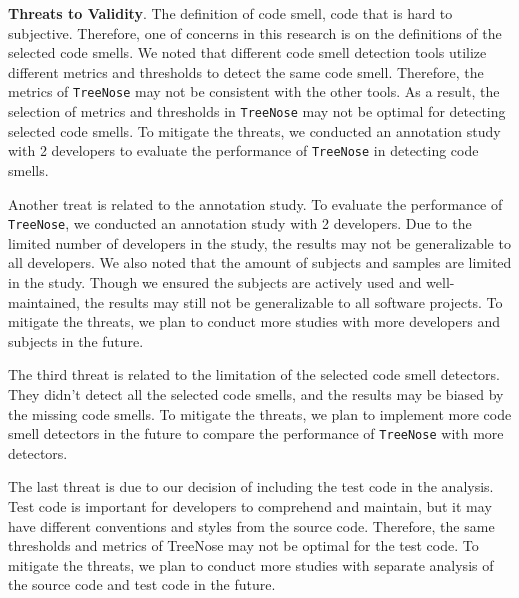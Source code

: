 {\bf Threats to Validity}. The definition of code smell, code that is hard to
subjective. Therefore, one of concerns in this research is on the definitions
of the selected code smells. We noted that different code smell detection tools
utilize different metrics and thresholds to detect the same code smell.
Therefore, the metrics of \texttt{TreeNose} may not be consistent with the
other tools. As a result, the selection of metrics and thresholds in
\texttt{TreeNose} may not be optimal for detecting selected code smells. To
mitigate the threats, we conducted an annotation study with 2 developers to
evaluate the performance of \texttt{TreeNose} in detecting code smells.

Another treat is related to the annotation study. To evaluate the performance
of \texttt{TreeNose}, we conducted an annotation study with 2 developers. Due
to the limited number of developers in the study, the results may not be
generalizable to all developers. We also noted that the amount of subjects and
samples are limited in the study. Though we ensured the subjects are actively
used and well-maintained, the results may still not be generalizable to all
software projects. To mitigate the threats, we plan to conduct more studies
with more developers and subjects in the future.

The third threat is related to the limitation of the selected code smell
detectors. They didn't detect all the selected code smells, and the results may
be biased by the missing code smells. To mitigate the threats, we plan to
implement more code smell detectors in the future to compare the performance of
\texttt{TreeNose} with more detectors.

The last threat is due to our decision of including the test code in the
analysis. Test code is important for developers to comprehend and maintain, but
it may have different conventions and styles from the source code. Therefore,
the same thresholds and metrics of TreeNose may not be optimal for the test
code. To mitigate the threats, we plan to conduct more studies with separate
analysis of the source code and test code in the future.
